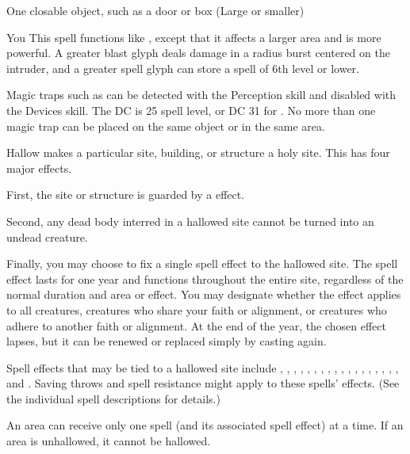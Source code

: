 \begin{spelltarget}{One closable object, such as a door or box (Large or smaller)}
\begin{spelltarget}{You}
\spelleffect This spell functions like , except that it affects a larger area and is more powerful. A greater blast glyph deals damage in a \areamed radius burst centered on the intruder, and a greater spell glyph can store a spell of 6th level or lower.
\spellnotes \par Magic traps such as  can be detected with the Perception skill and disabled with the Devices skill. The DC is 25 \add spell level, or DC 31 for . No more than one magic trap can be placed on the same object or in the same area.

\spelleffect Hallow makes a particular site, building, or structure a holy site. This has four major effects.
\par First, the site or structure is guarded by a  effect.
\par Second, any dead body interred in a hallowed site cannot be turned into an undead creature.
\par Finally, you may choose to fix a single spell effect to the hallowed site. The spell effect lasts for one year and functions throughout the entire site, regardless of the normal duration and area or effect. You may designate whether the effect applies to all creatures, creatures who share your faith or alignment, or creatures who adhere to another faith or alignment. At the end of the year, the chosen effect lapses, but it can be renewed or replaced simply by casting  again.
\par Spell effects that may be tied to a hallowed site include , , , , , , , , , , , , , , , , , , and . Saving throws and spell resistance might apply to these spells' effects. (See the individual spell descriptions for details.)
\spellnotes \par An area can receive only one  spell (and its associated spell effect) at a time. If an area is unhallowed, it cannot be hallowed.


\end{spelltarget}
\end{spelltarget}
